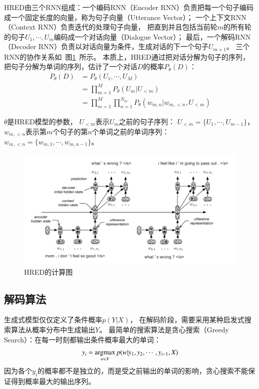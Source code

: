 HRED由三个RNN组成：一个编码RNN（Encoder RNN）负责把每一个句子编码成一个固定长度的向量，称为句子向量（Utterance Vector）；
一个上下文RNN（Context RNN）负责迭代的处理句子向量，
把直到并且包括当前轮$m$的所有轮的句子$U_1, \cdots, U_m$编码成一个对话向量（Dialogue Vector）；
最后，一个解码RNN（Decoder RNN）负责以对话向量为条件，生成对话的下一个句子$U_{m+1}$。
三个RNN的协作关系如~图\ref{fig:HRED_computation_graph}~所示。
本质上，HRED通过把对话分解为句子的序列，
把句子分解为单词的序列，估计了一个对话$D$的概率$P_{\theta}(D)$：
\begin{align}
    P_{\theta}(D) &= P_{\theta}(U_1, \cdots, U_M) \\
    &= \prod_{m=1}^M P_{\theta}(U_m|U_{<m}) \\
    &= \prod_{m=1}^M \prod_{n=1}^{N_m} P_{\theta}(
    w_{m, n} |w_{m, <n}, U_{<m}
    )
\end{align}

$\theta$是HRED模型的参数，
$U_{<m}$表示$U_m$之前的句子序列：
$U_{<m} = \{ U_1, \cdots, U_{m-1} \}$，
$w_{m, <n}$表示第$m$个句子的第$n$个单词之前的单词序列：
$w_{m, <n} = \{ w_{m, 1}, \cdots, w_{m, n-1} \}$。

\begin{figure}[H]
    \centering
    \includegraphics[width=\textwidth]{figure/HRED.png}
    \caption{HRED的计算图}
    \label{fig:HRED_computation_graph}
\end{figure}


\subsection{解码算法}\label{subsec:decode}
生成式模型仅仅定义了条件概率$p(Y|X)$，
在解码阶段，需要采用某种启发式搜索算法从概率分布中生成输出$Y$。
最简单的搜索算法是贪心搜索（Greedy Search）：在每一时刻都输出条件概率最大的单词：
\begin{align}
    y_i = \operatorname*{argmax}_{w \in V} p(w|y_1, y_2, \cdots, y_{i-1}, X)
\end{align}
因为各个$y_i$的概率都不是独立的，而是受之前输出的单词的影响，贪心搜索不能保证得到概率最大的输出序列。

